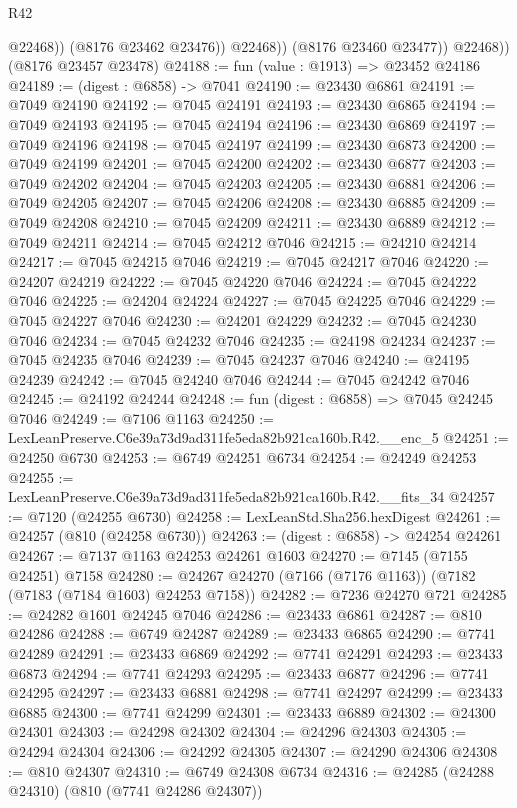 \begin{lexlean}{R42}
\begin{coremodule}
{                    @22468))
                (@8176 @23462 @23476))
              @22468))
          (@8176 @23460 @23477))
        @22468))
    (@8176 @23457 @23478)
@24188 := fun (value : @1913) => @23452 @24186
@24189 := (digest : @6858) -> @7041
@24190 := @23430 @6861
@24191 := @7049 @24190
@24192 := @7045 @24191
@24193 := @23430 @6865
@24194 := @7049 @24193
@24195 := @7045 @24194
@24196 := @23430 @6869
@24197 := @7049 @24196
@24198 := @7045 @24197
@24199 := @23430 @6873
@24200 := @7049 @24199
@24201 := @7045 @24200
@24202 := @23430 @6877
@24203 := @7049 @24202
@24204 := @7045 @24203
@24205 := @23430 @6881
@24206 := @7049 @24205
@24207 := @7045 @24206
@24208 := @23430 @6885
@24209 := @7049 @24208
@24210 := @7045 @24209
@24211 := @23430 @6889
@24212 := @7049 @24211
@24214 := @7045 @24212 @7046
@24215 := @24210 @24214
@24217 := @7045 @24215 @7046
@24219 := @7045 @24217 @7046
@24220 := @24207 @24219
@24222 := @7045 @24220 @7046
@24224 := @7045 @24222 @7046
@24225 := @24204 @24224
@24227 := @7045 @24225 @7046
@24229 := @7045 @24227 @7046
@24230 := @24201 @24229
@24232 := @7045 @24230 @7046
@24234 := @7045 @24232 @7046
@24235 := @24198 @24234
@24237 := @7045 @24235 @7046
@24239 := @7045 @24237 @7046
@24240 := @24195 @24239
@24242 := @7045 @24240 @7046
@24244 := @7045 @24242 @7046
@24245 := @24192 @24244
@24248 := fun (digest : @6858) => @7045 @24245 @7046
@24249 := @7106 @1163
@24250 := LexLeanPreserve.C6e39a73d9ad311fe5eda82b921ca160b.R42.__enc_5
@24251 := @24250 @6730
@24253 := @6749 @24251 @6734
@24254 := @24249 @24253
@24255 := LexLeanPreserve.C6e39a73d9ad311fe5eda82b921ca160b.R42.__fits_34
@24257 := @7120 (@24255 @6730)
@24258 := LexLeanStd.Sha256.hexDigest
@24261 := @24257 (@810 (@24258 @6730))
@24263 := (digest : @6858) -> @24254 @24261
@24267 := @7137 @1163 @24253 @24261 @1603
@24270 := @7145 (@7155 @24251) @7158
@24280 := @24267 @24270 (@7166 (@7176 @1163)) (@7182 (@7183 (@7184 @1603) @24253 @7158))
@24282 := @7236 @24270 @721
@24285 := @24282 @1601 @24245 @7046
@24286 := @23433 @6861
@24287 := @810 @24286
@24288 := @6749 @24287
@24289 := @23433 @6865
@24290 := @7741 @24289
@24291 := @23433 @6869
@24292 := @7741 @24291
@24293 := @23433 @6873
@24294 := @7741 @24293
@24295 := @23433 @6877
@24296 := @7741 @24295
@24297 := @23433 @6881
@24298 := @7741 @24297
@24299 := @23433 @6885
@24300 := @7741 @24299
@24301 := @23433 @6889
@24302 := @24300 @24301
@24303 := @24298 @24302
@24304 := @24296 @24303
@24305 := @24294 @24304
@24306 := @24292 @24305
@24307 := @24290 @24306
@24308 := @810 @24307
@24310 := @6749 @24308 @6734
@24316 := @24285 (@24288 @24310) (@810 (@7741 @24286 @24307))
}
\end{coremodule}
\end{lexlean}
